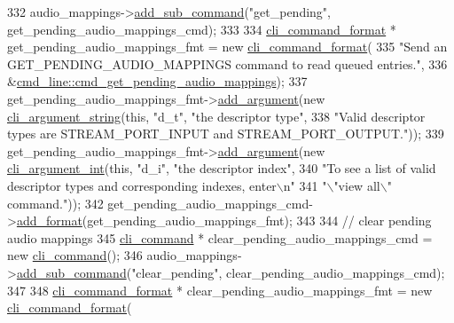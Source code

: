 \begin{DoxyCode}
332     audio\_mappings->\hyperlink{classcli__command_aa73a67e8ebb6facd4b40ced66279b226}{add\_sub\_command}(\textcolor{stringliteral}{"get\_pending"}, get\_pending\_audio\_mappings\_cmd);
333 
334     \hyperlink{classcli__command__format}{cli\_command\_format} * get\_pending\_audio\_mappings\_fmt = \textcolor{keyword}{new} 
      \hyperlink{classcli__command__format}{cli\_command\_format}(
335         \textcolor{stringliteral}{"Send an GET\_PENDING\_AUDIO\_MAPPINGS command to read queued entries."},
336         &\hyperlink{classcmd__line_a7e54e68c1ece07bc4c6e8da442a74289}{cmd\_line::cmd\_get\_pending\_audio\_mappings});
337     get\_pending\_audio\_mappings\_fmt->\hyperlink{classcli__command__format_ac3fc6d13a227c195d5ee6f7b78eba9cd}{add\_argument}(\textcolor{keyword}{new} 
      \hyperlink{classcli__argument__string}{cli\_argument\_string}(\textcolor{keyword}{this}, \textcolor{stringliteral}{"d\_t"}, \textcolor{stringliteral}{"the descriptor type"},
338                                                                          \textcolor{stringliteral}{"Valid descriptor types are
       STREAM\_PORT\_INPUT and STREAM\_PORT\_OUTPUT."}));
339     get\_pending\_audio\_mappings\_fmt->\hyperlink{classcli__command__format_ac3fc6d13a227c195d5ee6f7b78eba9cd}{add\_argument}(\textcolor{keyword}{new} 
      \hyperlink{classcli__argument__int}{cli\_argument\_int}(\textcolor{keyword}{this}, \textcolor{stringliteral}{"d\_i"}, \textcolor{stringliteral}{"the descriptor index"},
340                                                                       \textcolor{stringliteral}{"To see a list of valid descriptor
       types and corresponding indexes, enter\(\backslash\)n"}
341                                                                       \textcolor{stringliteral}{"\(\backslash\)"view all\(\backslash\)" command."}));
342     get\_pending\_audio\_mappings\_cmd->\hyperlink{classcli__command_aa9ec38e761644d946f8db2b920e39921}{add\_format}(get\_pending\_audio\_mappings\_fmt);
343 
344     \textcolor{comment}{// clear pending audio mappings}
345     \hyperlink{classcli__command}{cli\_command} * clear\_pending\_audio\_mappings\_cmd = \textcolor{keyword}{new} \hyperlink{classcli__command}{cli\_command}();
346     audio\_mappings->\hyperlink{classcli__command_aa73a67e8ebb6facd4b40ced66279b226}{add\_sub\_command}(\textcolor{stringliteral}{"clear\_pending"}, clear\_pending\_audio\_mappings\_cmd);
347 
348     \hyperlink{classcli__command__format}{cli\_command\_format} * clear\_pending\_audio\_mappings\_fmt = \textcolor{keyword}{new} 
      \hyperlink{classcli__command__format}{cli\_command\_format}(

\end{DoxyCode}
